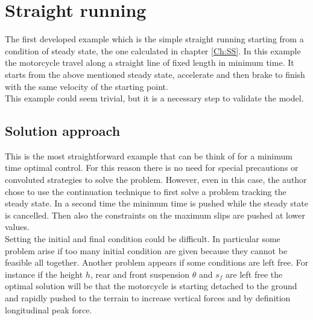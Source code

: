 \section{Straight running}
%
The first developed example which is the simple straight running starting from a condition of steady state, the one calculated in chapter \ref{Ch:SS}. In this example the motorcycle travel along a straight line of fixed length in minimum time. It starts from the above mentioned steady state, accelerate and then brake to finish with the same velocity of the starting point.\\
This example could seem trivial, but it is a necessary step to validate the model.
%
\subsection{Solution approach}
%
This is the most straightforward example that can be think of for a minimum time optimal control. For this reason there is no need for special precautions or convoluted strategies to solve the problem. However, even in this case, the author chose to use the continuation technique to first solve a problem tracking the steady state. In a second time the minimum time is pushed while the steady state is cancelled. Then also the constraints on the maximum slips are pushed at lower values.\\
Setting the initial and final condition could be difficult. In particular some problem arise if too many initial condition are given because they cannot be feasible all together. Another problem appears if some conditions are left free. For instance if the height $h$, rear and front suspension $\theta$ and $s_f$ are left free the optimal solution will be that the motorcycle is starting detached to the ground and rapidly pushed to the terrain to increase vertical forces and by definition longitudinal peak force. 
%
